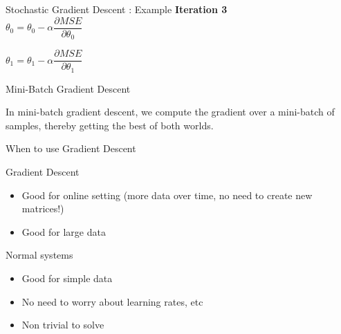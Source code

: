\documentclass{beamer}
\begin{document}
\begin{frame}{Stochastic Gradient Descent : Example}
\textbf{Iteration 3}\\
\vspace{0.5cm}
$\theta_0 = \theta_0 - \alpha\dfrac{\partial MSE}{\partial \theta_0}$\\ 
\vspace{0.5cm}

$\theta_1 = \theta_1 - \alpha\dfrac{\partial MSE}{\partial \theta_1}$\\ 
\vspace{0.5cm}
\end{frame}

	
	\begin{frame}{Mini-Batch Gradient Descent}
		
		In mini-batch gradient descent, we compute the gradient over a mini-batch of samples, thereby getting the best of both worlds.
		
	\end{frame}
	
	\begin{frame}{When to use Gradient Descent}
		
		
		Gradient Descent
		\begin{itemize}
			\item Good for online setting (more data over time, no need to create new matrices!)
			\item Good for large data
		\end{itemize}
		
		
		Normal systems
		\begin{itemize}
			\item Good for simple data
			\item No need to worry about learning rates, etc
			\item Non trivial to solve
		\end{itemize}
	\end{frame}
	
	
	
\end{document}
